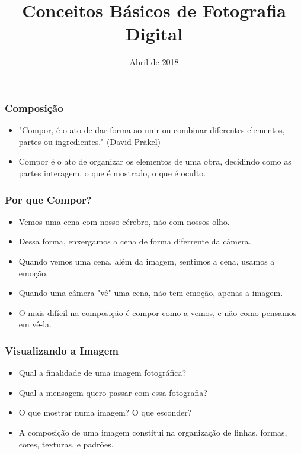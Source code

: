 


\title{Conceitos Básicos de Fotografia Digital}
\author{}
\date{Abril de 2018}



\coverframe

\begin{frame}
    \frametitle{Composição}
    \begin{itemize}
      \item "Compor, é o ato de dar forma ao unir ou combinar diferentes elementos,
      partes ou ingredientes." (David Präkel)
      \item Compor é o ato de organizar os elementos de uma obra, decidindo como
      as partes interagem, o que é mostrado, o que é oculto.
    \end{itemize}
\end{frame}

\begin{frame}
    \frametitle{Por que Compor?}
    \begin{itemize}
      \item Vemos uma cena com nosso cérebro, não com nossos olho.
      \item Dessa forma, enxergamos a cena de forma diferrente da câmera.
      \item Quando vemos uma cena, além da imagem, sentimos a cena, usamos a emoção.
      \item Quando uma câmera "vê" uma cena, não tem emoção, apenas a imagem.
      \item O mais difícil na composição é compor como a vemos, e não como pensamos em vê-la.
    \end{itemize}
\end{frame}

\begin{frame}
    \frametitle{Visualizando a Imagem}
    \begin{itemize}
      \item Qual a finalidade de uma imagem fotográfica?
      \item Qual a mensagem quero passar com essa fotografia?
      \item O que mostrar numa imagem? O que esconder?
      \item A composição de uma imagem constitui na organização de linhas, formas,
      cores, texturas, e padrões.
    \end{itemize}
\end{frame}

